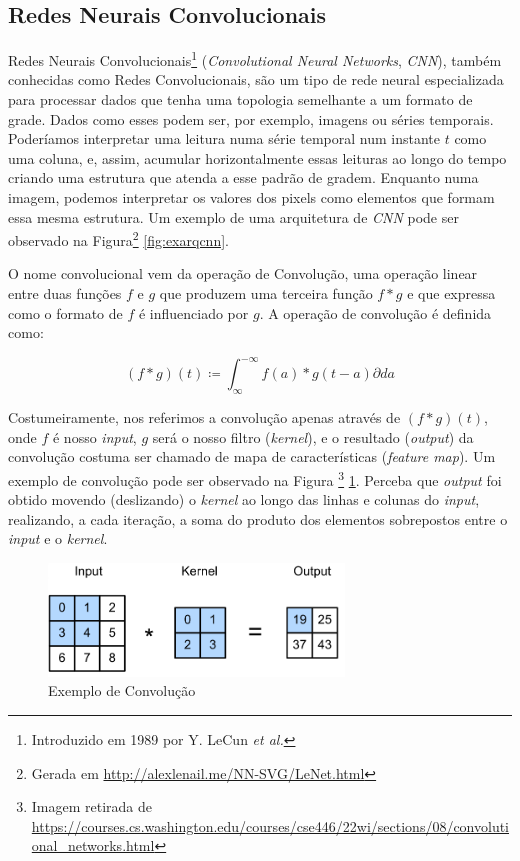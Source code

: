 \subsection{Redes Neurais Convolucionais}

Redes Neurais Convolucionais\footnote{Introduzido em 1989 por Y. LeCun \textit{et al.}} (\textit{Convolutional Neural Networks}, \textit{CNN}), também conhecidas como Redes Convolucionais, são um tipo de rede neural especializada para processar dados que tenha uma topologia semelhante a um formato de grade. Dados como esses podem ser, por exemplo, imagens ou séries temporais. Poderíamos interpretar uma leitura numa série temporal num instante $t$ como uma coluna, e, assim, acumular horizontalmente essas leituras ao longo do tempo criando uma estrutura que atenda a esse padrão de gradem. Enquanto numa imagem, podemos interpretar os valores dos pixels como elementos que formam essa mesma estrutura. Um exemplo de uma arquitetura de \textit{CNN} pode ser observado na Figura\footnote{Gerada em \url{http://alexlenail.me/NN-SVG/LeNet.html}} \ref{fig:exarqcnn}.

O nome convolucional vem da operação de Convolução, uma operação linear entre duas funções $f$ e $g$ que produzem uma terceira função $f*g$ e que expressa como o formato de $f$ é influenciado por $g$. A operação de convolução é definida como:

\begin{equation}
(f*g)(t) \coloneqq \int^{-\infty}_{\infty}{f(a) * g(t - a) \partial{da}}
\end{equation}

Costumeiramente, nos referimos a convolução apenas através de $(f*g)(t)$, onde $f$ é nosso \textit{input}, $g$ será o nosso filtro (\textit{kernel}),  e o resultado (\textit{output}) da convolução costuma ser chamado de mapa de características (\textit{feature map}). Um exemplo de convolução pode ser observado na Figura \footnote{Imagem retirada de \url{https://courses.cs.washington.edu/courses/cse446/22wi/sections/08/convolutional_networks.html}} \ref{fig:2dconv}. Perceba que \textit{output} foi obtido movendo (deslizando) o \textit{kernel} ao longo das linhas e colunas do \textit{input}, realizando, a cada iteração, a soma do produto dos elementos sobrepostos entre o \textit{input} e o \textit{kernel}.

\begin{figure}[!h]
\centering
\includegraphics[width=0.7\textwidth]{imagens/2dconv.png}
\caption{\label{fig:2dconv}Exemplo de Convolução}
\end{figure}


